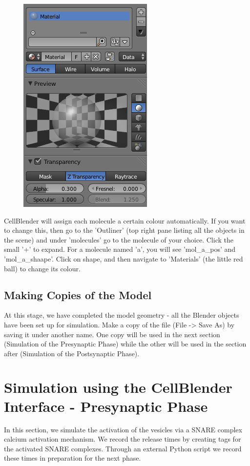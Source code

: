 \documentclass[twoside,a4paper]{refart}
\begin{document}
    \begin{figure}[H]
        \includegraphics[scale=0.5]{settings3.png}
    \end{figure}

CellBlender will assign each molecule a certain colour automatically. If you want to change this, then go to the 'Outliner' (top right pane listing all the objects in the scene) and under 'molecules' go to the molecule of your choice. Click the small '+' to expand. For a molecule named 'a', you will see 'mol\_a\_pos' and 'mol\_a\_shaape'. Click on shape, and then navigate to 'Materials' (the little red ball) to change its colour.


\subsection{Making Copies of the Model}
At this stage, we have completed the model geometry - all the Blender objects have been set up for simulation. Make a copy of the file  (File -> Save As) by saving it under another name. One copy will be used in the next section (Simulation of the Presynaptic Phase) while the other will be used in the section after (Simulation of the Postsynaptic Phase).

\section{Simulation using the CellBlender Interface - Presynaptic Phase}

In this section, we simulate the activation of the vesicles via a SNARE complex calcium activation mechanism. We record the release times by creating tags for the activated SNARE complexes. Through an external Python script we record these times in preparation for the next phase.
\end{document}
